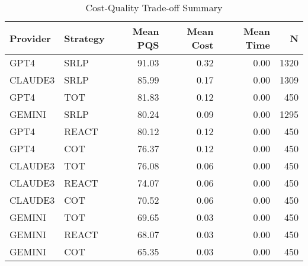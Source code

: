 \begin{table}[htbp]
\centering
\caption{Cost-Quality Trade-off Summary}
\label{tab:cost_quality}
\begin{tabular}{llrrrr}
\toprule
Provider & Strategy & Mean PQS & Mean Cost & Mean Time & N \\
\midrule
GPT4 & SRLP & 91.03 & 0.32 & 0.00 & 1320 \\
CLAUDE3 & SRLP & 85.99 & 0.17 & 0.00 & 1309 \\
GPT4 & TOT & 81.83 & 0.12 & 0.00 & 450 \\
GEMINI & SRLP & 80.24 & 0.09 & 0.00 & 1295 \\
GPT4 & REACT & 80.12 & 0.12 & 0.00 & 450 \\
GPT4 & COT & 76.37 & 0.12 & 0.00 & 450 \\
CLAUDE3 & TOT & 76.08 & 0.06 & 0.00 & 450 \\
CLAUDE3 & REACT & 74.07 & 0.06 & 0.00 & 450 \\
CLAUDE3 & COT & 70.52 & 0.06 & 0.00 & 450 \\
GEMINI & TOT & 69.65 & 0.03 & 0.00 & 450 \\
GEMINI & REACT & 68.07 & 0.03 & 0.00 & 450 \\
GEMINI & COT & 65.35 & 0.03 & 0.00 & 450 \\
\bottomrule
\end{tabular}
\end{table}